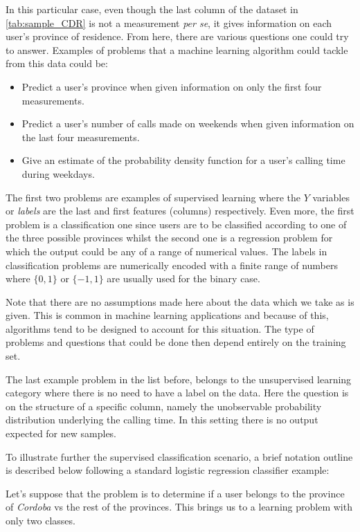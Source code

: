 In this particular case, even though the last column of the dataset in \ref{tab:sample_CDR} is not a measurement \textit{per se}, it gives information on each user's province of residence. From here, there are various questions one could try to answer. Examples of problems that a machine learning algorithm could tackle from this data could be: 

\begin{itemize}
	\item Predict a user's province when given information on only the first four measurements.
	\item Predict a user's number of calls made on weekends when given information on the last four measurements.
	\item Give an estimate of the probability density function for a user's calling time during weekdays.
\end{itemize}

The first two problems are examples of supervised learning where the $Y$ variables or \textit{labels} are the last and first features (columns) respectively. Even more, the first problem is a classification one since users are to be classified according to one of the three possible provinces whilst the second one is a regression problem for which the output could be any of a range of numerical values. The labels in classification problems are numerically encoded with a finite range of numbers where $\{0,1\}$ or $\{-1,1\}$ are usually used for the binary case.

Note that there are no assumptions made here about the data which we take as is given. %
This is common in machine learning applications and because of this, algorithms tend to be designed to account for this situation. The type of problems and questions that could be done then depend entirely on the training set. 

The last example problem in the list before, belongs to the unsupervised learning category where there is no need to have a label on the data. Here the question is on the structure of a specific column, namely the unobservable probability distribution underlying the calling time. In this setting there is no output expected for new samples.

To illustrate further the supervised classification scenario, a brief notation outline is described below following a standard logistic regression classifier example:

Let's suppose that the problem is to determine if a user belongs to the province of \textit{Cordoba} vs the rest of the provinces. This brings us to a learning problem with only two classes. %
 
